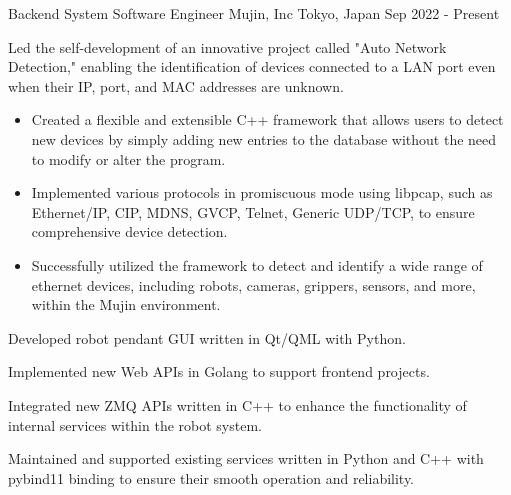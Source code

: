 
\vspace{-2mm}

\begin{cventries}

  \cventry
    {Backend System Software Engineer} %
    {Mujin, Inc} %
    {Tokyo, Japan} %
    {Sep 2022 - Present} %
    {
      \begin{cvitems} %
        \item {
          Led the self-development of an innovative project called "Auto Network Detection," enabling the identification of devices connected to a LAN port even when their IP, port, and MAC addresses are unknown.
          \begin{itemize}
            \item {
              Created a flexible and extensible C++ framework that allows users to detect new devices by simply adding new entries to the database without the need to modify or alter the program.
            }
            \item {
              Implemented various protocols in promiscuous mode using libpcap, such as Ethernet/IP, CIP, MDNS, GVCP, Telnet, Generic UDP/TCP, to ensure comprehensive device detection.
            }
            \item {
              Successfully utilized the framework to detect and identify a wide range of ethernet devices, including robots, cameras, grippers, sensors, and more, within the Mujin environment.
            }
          \end{itemize}
        }
        \item {Developed robot pendant GUI written in Qt/QML with Python.}
        \item {Implemented new Web APIs in Golang to support frontend projects.}
        \item {Integrated new ZMQ APIs written in C++ to enhance the functionality of internal services within the robot system.}
        \item {Maintained and supported existing services written in Python and C++ with pybind11 binding to ensure their smooth operation and reliability.}
      \end{cvitems}
    }


\end{cventries}
